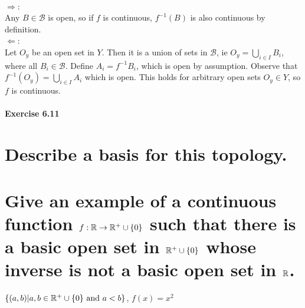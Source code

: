 \begin{solution}
 \\$\Rightarrow$: \\
 Any $B \in \mathcal{B}$ is open, so if $f$ is continuous, $f^{-1}(B)$ is also continuous by definition. \\
 $\Leftarrow$: \\
 Let $O_y$ be an open set in $Y$. Then it is a union of sets in $\mathcal{B}$, ie $O_y = \bigcup_{i \in I} B_i$, where all $B_i \in \mathcal{B}$. Define $A_i = f^{-1}B_i$, which is open by assumption. Observe that $f^{-1}(O_y) = \bigcup_{i \in I} A_i$ which is open. This holds for arbitrary open sets $O_y \in Y$, so $f$ is continuous.
\end{solution}

\subsection{Exercise 6.11}
\setcounter{question}{0}


\begin{parts}
 \part{Describe a basis for this topology.}
 \part{Give an example of a continuous function $f:\mathbb{R} \rightarrow \mathbb{R}^+ \cup \{0\}$ such that there is a basic open set in $\mathbb{R}^+ \cup \{0\}$ whose inverse is not a basic open set in $\mathbb{R}$.}
 
\begin{solution}
 $\{(a,b)|a,b \in \mathbb{R}^+ \cup \{0\} \text{ and } a < b\}$, $f(x) = x^2$
\end{solution}
\end{parts}
